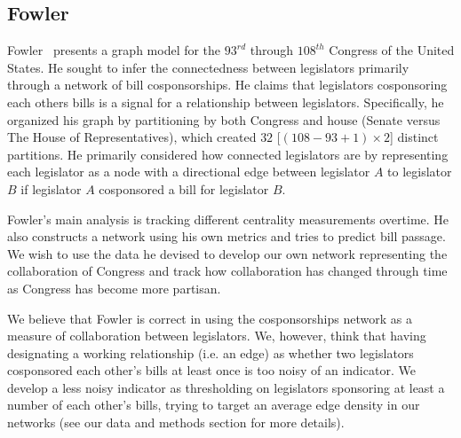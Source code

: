 \subsection{Fowler}

Fowler~\cite{Fowler} presents a graph model for the $93^{rd}$ through $108^{th}$
Congress of the United  States. He sought to infer the connectedness between
legislators primarily  through a network of bill cosponsorships. He claims that
legislators  cosponsoring each others bills is a signal for a relationship
between legislators. Specifically, he organized his graph by partitioning by
both Congress and house  (Senate versus The House of Representatives), which
created $32$  [$(108 - 93 + 1) \times 2$] distinct partitions. He primarily
considered how  connected legislators are by representing each legislator as a
node with a  directional edge between legislator $A$ to legislator $B$ if
legislator $A$  cosponsored a bill for legislator $B$.

Fowler's main analysis is tracking different centrality measurements overtime.
He also constructs a network using his own metrics and tries to predict bill
passage. We wish to use the data he devised to develop our own network
representing the collaboration of Congress and track how collaboration has
changed through time as Congress has become more partisan.

We believe that Fowler is correct in using the cosponsorships network as a
measure of collaboration between legislators. We, however, think that having
designating a working relationship (i.e. an edge) as whether two legislators
cosponsored each other's bills at least once is too noisy of an indicator. We
develop a less noisy indicator as thresholding on legislators sponsoring at
least a number of each other's bills, trying to target an average edge density
in our networks (see our data and methods section for more details).